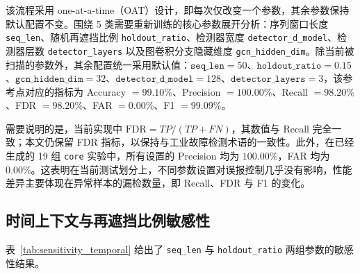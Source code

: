 \documentclass[bachelor, vlined]{DissertUESTC}
\begin{document}
    该流程采用 one-at-a-time（OAT）设计，即每次仅改变一个参数，其余参数保持默认配置不变。围绕 5 类需要重新训练的核心参数展开分析：序列窗口长度 \texttt{seq\_len}、随机再遮挡比例 \texttt{holdout\_ratio}、检测器宽度 \texttt{detector\_d\_model}、检测器层数 \texttt{detector\_layers} 以及图卷积分支隐藏维度 \texttt{gcn\_hidden\_dim}。除当前被扫描的参数外，其余配置统一采用默认值：\(\texttt{seq\_len}=50\)、\(\texttt{holdout\_ratio}=0.15\)、\(\texttt{gcn\_hidden\_dim}=32\)、\(\texttt{detector\_d\_model}=128\)、\(\texttt{detector\_layers}=3\)，该参考点对应的指标为 Accuracy \(=99.10\%\)、Precision \(=100.00\%\)、Recall \(=98.20\%\)、FDR \(=98.20\%\)、FAR \(=0.00\%\)、F1 \(=99.09\%\)。
    
    需要说明的是，当前实现中 \(\mathrm{FDR}=TP/(TP+FN)\)，其数值与 Recall 完全一致；本文仍保留 FDR 指标，以保持与工业故障检测术语的一致性。此外，在已经生成的 19 组 \texttt{core} 实验中，所有设置的 Precision 均为 \(100.00\%\)，FAR 均为 \(0.00\%\)。这表明在当前测试划分上，不同参数设置对误报控制几乎没有影响，性能差异主要体现在异常样本的漏检数量，即 Recall、FDR 与 F1 的变化。
    
    \subsection{时间上下文与再遮挡比例敏感性}
    
    表~\ref{tab:sensitivity_temporal} 给出了 \texttt{seq\_len} 与 \texttt{holdout\_ratio} 两组参数的敏感性结果。
    
\end{document}
